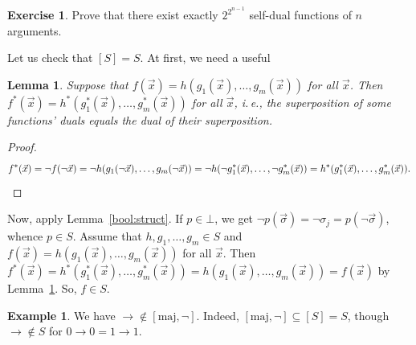 \documentclass[12pt,notitlepage]{article}
\theoremstyle{plain}
\newtheorem{lemma}[thm]{Lemma}
\theoremstyle{definition}
\newtheorem{exc}[thm]{Exercise}
\newtheorem{exm}[thm]{Example}
\theoremstyle{plain}
\newcommand{\sbs}{\subseteq}
\newcommand{\1}{\mathbf{1}}
\newcommand{\0}{\mathbf{0}}
\begin{document}
\begin{exc}
Prove that there exist exactly $2^{2^{n-1}}$ self-dual functions of $n$ arguments.
\end{exc}

\noindent Let us check that $[S] = S$. At first, we need a useful
\begin{lemma}\label{bool:dual_super}
Suppose that $f(\vec x) = h(g_1(\vec x),\ldots, g_m(\vec x))$ for all $\vec x$. Then $f^*(\vec x) = h^*(g^*_1(\vec x),\ldots, g^*_m(\vec x))$ for all $\vec x$, i.\,e.,
the superposition of some functions' duals equals the dual of their superposition.
\end{lemma}
\begin{proof}
$$
f^*(\vec x) = \neg f (\neg\vec x) =  \neg h(g_1(\neg \vec x),\ldots,g_m(\neg \vec x)) =\\
\neg h(\neg g^*_1(\vec x),\ldots,\neg g^*_m(\vec x)) = h^*(g^*_1(\vec x),\ldots,g^*_m(\vec x)).
$$
\end{proof}
Now, apply Lemma~\ref{bool:struct}. If $p \in \bot$, we get $\neg p(\vec \sigma) = \neg \sigma_j = p(\neg\vec\sigma)$, whence $p \in S$. Assume that $h, g_1, \ldots,g_m \in S$ and $f(\vec x) = h(g_1(\vec x),\ldots, g_m(\vec x))$ for all $\vec x$. Then $f^*(\vec x) = h^*(g^*_1(\vec x),\ldots,g^*_m(\vec x)) = h(g_1(\vec x),\ldots, g_m(\vec x)) = f(\vec x)$ by Lemma~\ref{bool:dual_super}. So, $f \in S$.

\begin{exm}
We have ${\to} \notin [\mathrm{maj}, {\neg}]$. Indeed, $[\mathrm{maj}, {\neg}] \sbs [S] = S$, though ${\to} \notin S$ for $0 \to 0 = 1 \to 1$.
\end{exm}
\end{document}

